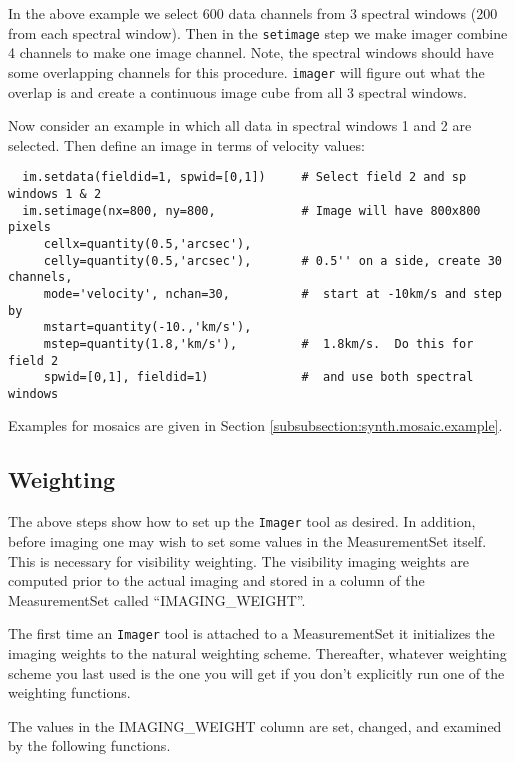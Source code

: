 In the above example we select 600 data channels from 3 spectral
windows (200 from each spectral window). Then in the {\tt setimage}
step we make imager combine 4 channels to make one image channel.
Note, the spectral windows should have some overlapping channels for
this procedure.  {\tt imager} will figure out what the overlap is and
create a continuous image cube from all 3 spectral windows.

Now consider an example in which all data in spectral windows 1 and 2
are selected.  Then define an image in terms of velocity values:

\small
\begin{verbatim}
  im.setdata(fieldid=1, spwid=[0,1])     # Select field 2 and sp windows 1 & 2
  im.setimage(nx=800, ny=800,            # Image will have 800x800 pixels
     cellx=quantity(0.5,'arcsec'),
     celly=quantity(0.5,'arcsec'),       # 0.5'' on a side, create 30 channels,
     mode='velocity', nchan=30,          #  start at -10km/s and step by
     mstart=quantity(-10.,'km/s'),
     mstep=quantity(1.8,'km/s'),         #  1.8km/s.  Do this for field 2
     spwid=[0,1], fieldid=1)             #  and use both spectral windows
\end{verbatim}
\normalsize

Examples for mosaics are given in Section
\ref{subsubsection:synth.mosaic.example}. 

\subsection{Weighting}
\label{subsection:synth.im.weight}

The above steps show how to set up the {\tt Imager} tool as desired.  In
addition, before imaging one may wish to set some values in the
MeasurementSet itself.  This is necessary for visibility weighting.  The
visibility imaging weights are computed prior to the actual imaging and
stored in a column of the MeasurementSet called ``IMAGING\_WEIGHT''.

The first time an {\tt Imager} tool is attached to a MeasurementSet it
initializes the imaging weights to the natural weighting scheme.
Thereafter, whatever weighting scheme you last used is the one you
will get if you don't explicitly run one of the weighting functions.

The values in the IMAGING\_WEIGHT column are set, changed, and
examined by the following functions.

